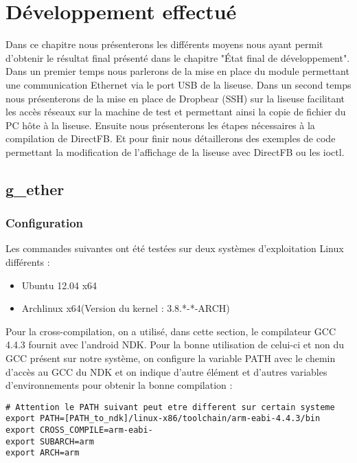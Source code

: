 \chapter{Développement effectué}

Dans ce chapitre nous présenterons les différents moyens nous ayant permit d'obtenir le résultat final présenté dans le chapitre "État final de développement".\\ 
Dans un premier temps nous parlerons de la mise en place du module permettant une communication Ethernet via le port USB de la liseuse. Dans un second temps nous présenterons de la mise en place de Dropbear (SSH) sur la liseuse facilitant les accès réseaux sur la machine de test et permettant ainsi la copie de fichier du PC hôte à la liseuse. Ensuite nous présenterons les étapes nécessaires à la compilation de DirectFB. Et pour finir nous détaillerons des exemples de code permettant la modification de l'affichage de la liseuse avec DirectFB ou les ioctl.

\section{g_ether}
\subsection{Configuration}

Les commandes suivantes ont été testées sur deux systèmes d'exploitation Linux différents : 
\\
\begin{itemize}

\item Ubuntu 12.04 x64 
\item Archlinux x64(Version du kernel : 3.8.*-*-ARCH)

\end{itemize}


Pour la cross-compilation, on a utilisé, dans cette section, le compilateur GCC 4.4.3 fournit avec l'android NDK. Pour la bonne utilisation de celui-ci et non du GCC présent sur notre système, on configure la variable PATH avec le chemin d'accès au GCC du NDK et on indique d'autre élément et d'autres variables d'environnements pour obtenir la bonne compilation :

\begin{lstlisting}
# Attention le PATH suivant peut etre different sur certain systeme
export PATH=[PATH_to_ndk]/linux-x86/toolchain/arm-eabi-4.4.3/bin 
export CROSS_COMPILE=arm-eabi-
export SUBARCH=arm
export ARCH=arm
\end{lstlisting}


